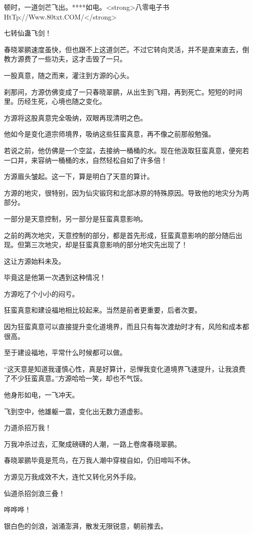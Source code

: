\begin{this_body}
顿时，一道剑芒飞出。****如电。<strong>八零电子书HtTp://Www.80txt.COM/</strong>

七转仙蛊飞剑！

春晓翠鹂速度虽快，但也跟不上这道剑芒。不过它转向灵活，并不是直来直去，倒教方源费了一些功夫，这才击毁了一只。

一股真意，随之而来，灌注到方源的心头。

刹那间，方源仿佛变成了一只春晓翠鹂，从出生到飞翔，再到死亡。短短的时间里。历经生死，心境也随之变化。

方源将这股真意完全吸纳，双眼再现清明之色。

他如今是变化道宗师境界，吸纳这些狂蛮真意，再不像之前那般勉强。

若说之前，他仿佛是一个空盆，去接纳一桶桶的水。现在他汲取狂蛮真意，便宛若一口井，来容纳一桶桶的水，自然轻松自如了许多倍！

方源眉头皱起。这一下，算是明白了天意的算计。

方源的地灾，很特别，因为仙灾锻窍和北部冰原的特殊原因。导致他的地灾分为两部分。

一部分是天意控制，另一部分是狂蛮真意影响。

之前的两次地灾，天意控制的部分，都是首先形成，狂蛮真意影响的部分随后出现。但第三次地灾，却是狂蛮真意影响的部分地灾先出现了！

这让方源始料未及。

毕竟这是他第一次遇到这种情况！

方源吃了个小小的闷亏。

狂蛮真意和建设福地相比较起来。当然是前者更重要，后者次要。

因为狂蛮真意可以直接提升变化道境界，而且只有每次渡劫时才有，风险和成本都很高。

至于建设福地，平常什么时候都可以做。

“这天意是知道我谨慎心性，真是好算计，忌惮我变化道境界飞速提升，让我浪费了不少狂蛮真意。”方源哈哈一笑，却也不气馁。

他身形如电，一飞冲天。

飞到空中，他雄躯一震，变化出无数力道虚影。

力道杀招万我！

万我冲杀过去，汇聚成磅礴的人潮，一路上卷席春晓翠鹂。

春晓翠鹂毕竟是荒鸟，在万我人潮中穿梭自如，仍旧啼叫不休。

方源见万我成效不大，连忙又转化另外手段。

仙道杀招剑浪三叠！

哗哗哗！

银白色的剑浪，汹涌澎湃，散发无限锐意，朝前推去。


\end{this_body}
